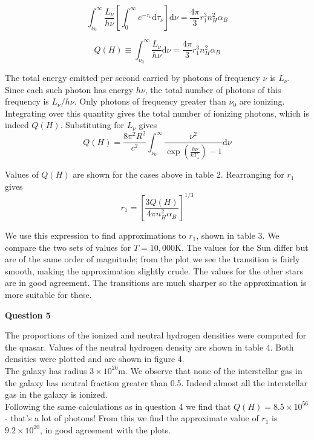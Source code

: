 \documentclass[12pt]{extarticle}
\begin{document}
$$\int_{\nu_0}^{\infty}\frac{L_{\nu}}{h\nu}\left[\int_0^{\infty}e^{-\tau_{\nu}}\mathrm{d}\tau_{\nu}\right]\mathrm{d}\nu = \frac{4\pi}{3} r_1^3 n_H^2 \alpha_B$$
 
$$Q(H) \equiv \int_{\nu_0}^{\infty}\frac{L_{\nu}}{h\nu}\mathrm{d}\nu = \frac{4\pi}{3} r_1^3 n_H^2 \alpha_B$$ 

The total energy emitted per second carried by photons of frequency $\nu$ is $L_{\nu}$. Since each such photon has energy $h\nu$, the total number of photons of this frequency is $L_{\nu}/h\nu$. Only photons of frequency greater than $\nu_0$ are ionizing. Integrating over this quantity gives the total number of ionizing photons, which is indeed $Q(H)$. Substituting for $L_{\nu}$ gives
$$Q(H) = \frac{8\pi^2 R^2}{c^2} \int_{\nu_0}^\infty \frac{\nu^2}{\exp(\frac{h \nu}{k T_{\star}})-1}\mathrm{d}\nu$$

Values of $Q(H)$ are shown for the cases above in table 2. Rearranging for $r_1$ gives
$$r_1 = \left[\frac{3Q(H)}{4\pi n_H^2\alpha_B}\right]^{1/3}$$

We use this expression to find approximations to $r_1$, shown in table 3. We compare the two sets of values for $T = 10,000$K. The values for the Sun differ but are of the same order of magnitude; from the plot we see the transition is fairly smooth, making the approximation slightly crude. The values for the other stars are in good agreement. The transitions are much sharper so the approximation is more suitable for these. \\

\begin{center}
\textbf{Question 5}
\end{center}

The proportions of the ionized and neutral hydrogen densities were computed for the quasar. Values of the neutral hydrogen density are shown in table 4. Both densities were plotted and are shown in figure 4.\\

The galaxy has radius $3\times 10^{20}$m. We observe that none of the interstellar gas in the galaxy has neutral fraction greater than 0.5. Indeed almost all the interstellar gas in the galaxy is ionized.\\

Following the same calculations as in question 4 we find that $Q(H) = 8.5 \times 10^{56}$ - that's a lot of photons! From this we find the approximate value of $r_1$ is $9.2\times 10^{20}$, in good agreement with the plots.
\end{document}

